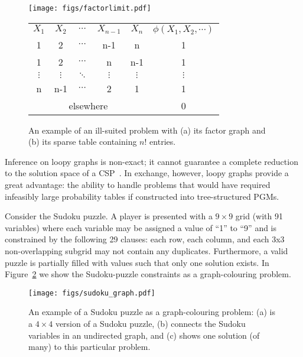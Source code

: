 \documentclass{ieeeaccess}
\newcommand\Tstrut{\rule{0pt}{2.6ex}}         %
\newcommand\Bstrut{\rule[-0.9ex]{0pt}{0pt}}   %
\begin{document}
\begin{figure}[h]
	\centering
	\hspace{-1em}\texttt{[image: figs/factorlimit.pdf]}
	\\$\ $\\
	\vspace{-0.82em}
	\begin{tabular}{ c c c c c |c }
		$X_1$ & $X_2$ & $\cdots$ & $X_{n-1}$ & $X_n$ & $\phi(X_1,X_2,\cdots)$  \\
		\cline{1-6}
		1\Tstrut & 2 & $\cdots$ & n-1 &  n & 1 \\
		1 & 2 & $\cdots$ & n & n-1 & 1 \\
		$\vdots$ & $\vdots$ & $\ddots $ & $\vdots$  & $\vdots$ & $\vdots$ \Bstrut  \\
		n & n-1 & $\cdots$ & 2 & 1 & 1 \\
		\cline{1-6}
		\multicolumn{5}{c|}{elsewhere\Tstrut} & 0
	\end{tabular}
	\vspace{0.1em}
	\caption{ An example of an ill-suited problem with (a) its factor graph and (b) its sparse table containing $n!$ entries.}\label{fig-factorlimit}
\end{figure}

Inference on loopy graphs is non-exact; it cannot guarantee a complete reduction to the solution space of a CSP~\cite{dechter2010on}. In exchange, however, loopy graphs provide a great advantage: the ability to handle problems that would have required infeasibly large probability tables if constructed into tree-structured PGMs.

Consider the Sudoku puzzle. A player is presented with a $9\times 9$ grid (with 91 variables) where each variable may be assigned a value of ``1'' to ``9'' and is constrained by the following 29 clauses: each row, each column, and each 3x3 non-overlapping subgrid may not contain any duplicates. Furthermore, a valid puzzle is partially filled with values such that only one solution exists. In Figure~\ref{fig:sudoku_colourgraph} we show the Sudoku-puzzle constraints as a graph-colouring problem.
\begin{figure}[!h]
	\centering
	\texttt{[image: figs/sudoku\_graph.pdf]}
	\caption{An example of a Sudoku puzzle as a graph-colouring problem: (a) is a $4\times 4$ version of a Sudoku puzzle, (b) connects the Sudoku variables in an undirected graph, and (c) shows one solution (of many) to this particular problem.
	}
	\label{fig:sudoku_colourgraph}
\end{figure}
\end{document}
